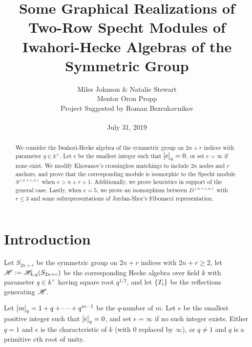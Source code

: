\documentclass{amsart}
\begin{document}
  \title[Some Graphical Realizations of Two-Row Specht Modules of Hecke Algebras]{Some Graphical Realizations of Two-Row Specht Modules of Iwahori-Hecke Algebras of the Symmetric Group}
  \author[Miles Johnson \& Natalie Stewart]{Miles Johnson \& Natalie Stewart\\
    Mentor Oron Propp\\
  Project Suggested by Roman Bezrukavnikov\\ \; \\
  July 31, 2019
  }

   \begin{titlepage}
    \maketitle
    \begin{abstract}
      We consider the Iwahori-Hecke algebra of the symmetric group on $2n + r$ indices with parameter $q \in k^\times$.
      Let $e$ be the smallest integer such that $\left[ e \right]_q = 0$, or set $e = \infty$ if none exist.
      We modify Khovanov's crossingless matchings to include $2n$ nodes and $r$ anchors, and prove that the corresponding module is isomorphic to the Specht module $S^{(n+r,n)}$ when $e > n + r + 1$.
      Additionally, we prove heuristics in support of the general case.
      Lastly, when $e = 5$, we prove an isomorphism between $D^{(n+r,n)}$ with $r \leq 3$ and some subrepresentations of Jordan-Shor's Fibonacci representation.
    \end{abstract}

  \begingroup
  \hypersetup{linkcolor=black} %
  \tableofcontents
  \endgroup

  \end{titlepage}

\section{Introduction} 
  Let $S_{2n+r}$ be the symmetric group on $2n+r$ indices with $2n + r \geq 2$, let $\mathscr{H} := \mathscr{H}_{k,q}(S_{2n+r})$ be the corresponding Hecke algebra over field $k$ with parameter $q \in k^\times$ having square root $q^{1/2}$, and let $\left\{ T_i \right\}$ be the reflections generating $\mathscr{H}$.
  
  Let $\left[ m \right]_q = 1 + q + \dots + q^{m-1}$ be the $q$-number of $m$. 
  Let $e$ be the smallest positive integer such that $\left[ e \right]_q = 0$, and set $e = \infty$ if no such integer exists.
  Either $q = 1$ and $e$ is the characteristic of $k$ (with $0$ replaced by $\infty$), or $q \neq 1$ and $q$ is a primitive $e$th root of unity.
\end{document}
